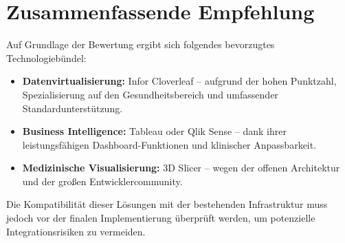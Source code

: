 \section{Zusammenfassende Empfehlung}
Auf Grundlage der Bewertung ergibt sich folgendes bevorzugtes Technologiebündel:
\begin{itemize}
	\item \textbf{Datenvirtualisierung:} Infor Cloverleaf – aufgrund der hohen Punktzahl, Spezialisierung auf den Gesundheitsbereich und umfassender Standardunterstützung.
	\item \textbf{Business Intelligence:} Tableau oder Qlik Sense – dank ihrer leistungsfähigen Dashboard-Funktionen und klinischer Anpassbarkeit.
	\item \textbf{Medizinische Visualisierung:} 3D Slicer – wegen der offenen Architektur und der großen Entwicklercommunity.

\end{itemize}Die Kompatibilität dieser Lösungen mit der bestehenden Infrastruktur muss jedoch vor der finalen Implementierung überprüft werden, um potenzielle Integrationsrisiken zu vermeiden.
